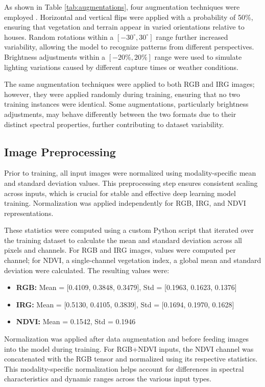 As shown in Table \ref{tab:augmentations}, four augmentation techniques were 
employed \cite{torchvision2016}. Horizontal and vertical flips were applied 
with a probability of 50\%, ensuring that vegetation and terrain appear in 
varied orientations relative to houses. Random rotations within a $[-30^{\circ}, 30^{\circ}]$ 
range further increased variability, allowing the model to recognize patterns from 
different perspectives. Brightness adjustments within a $[-20\%, 20\%]$ range 
were used to simulate lighting variations caused by different capture times or weather conditions.

The same augmentation techniques were applied to both RGB and IRG images; however, 
they were applied randomly during training, ensuring that no two training instances 
were identical. Some augmentations, particularly brightness adjustments, may behave 
differently between the two formats due to their distinct spectral properties, 
further contributing to dataset variability.

\subsection{Image Preprocessing}

Prior to training, all input images were normalized using modality-specific 
mean and standard deviation values. This preprocessing step ensures consistent 
scaling across inputs, which is crucial for stable and effective deep learning model training. 
Normalization was applied independently for RGB, IRG, and NDVI representations.

These statistics were computed using a custom Python script that iterated over 
the training dataset to calculate the mean and standard deviation across all pixels and channels. 
For RGB and IRG images, values were computed per channel; for NDVI, a single-channel vegetation index, 
a global mean and standard deviation were calculated. The resulting values were:

\begin{itemize}
    \item \textbf{RGB:} Mean = [0.4109, 0.3848, 0.3479], Std = [0.1963, 0.1623, 0.1376]
    \item \textbf{IRG:} Mean = [0.5130, 0.4105, 0.3839], Std = [0.1694, 0.1970, 0.1628]
    \item \textbf{NDVI:} Mean = 0.1542, Std = 0.1946
\end{itemize}

Normalization was applied after data augmentation and before feeding images into the model 
during training. For RGB+NDVI inputs, the NDVI channel was concatenated with the RGB tensor 
and normalized using its respective statistics. This modality-specific normalization helps 
account for differences in spectral characteristics and dynamic ranges across the various input types.


